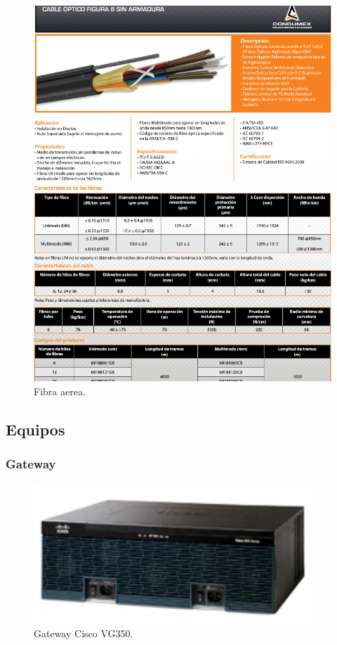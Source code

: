 \documentclass[12pt,letterpaper]{article}
\begin{document}
\newpage
\begin{figure}[ht]
    \centering
    \includegraphics[width=.67\textwidth]{imagenes/fibra2.PNG}
    \caption{Fibra aerea.}
\end{figure}

\newpage
\subsection{Equipos}
\subsubsection{Gateway}
\begin{figure}[ht]
    \centering
    \includegraphics[width=.4\textwidth]{imagenes/gateway.PNG}
    \caption{Gateway Cisco VG350.}
\end{figure}
\end{document}

